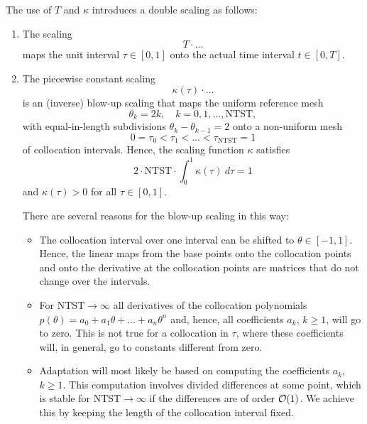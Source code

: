 The use of $T$ and $\kappa$ introduces a double scaling as follows:
\begin{enumerate}
\item The scaling $$T\cdot \dots$$ maps the unit interval $\tau\in[0,1]$ onto the actual time interval $t\in[0,T]$.
\item The piecewise constant scaling $$\kappa(\tau)\cdot\dots$$ is an (inverse) blow-up scaling that maps the uniform reference mesh $$ \theta_k = 2k, \quad k=0,1,\dots,\mathrm{NTST}, $$ with equal-in-length subdivisions $\theta_k - \theta_{k-1} = 2$ onto a non-uniform mesh $$0 = \tau_0 < \tau_1 < \dots < \tau_{\mathrm{NTST}} = 1$$ of collocation intervals. Hence, the scaling function $\kappa$ satisfies $$ 2\cdot \mathrm{NTST}\cdot \int_0^1\kappa(\tau)\:d\tau = 1$$ and $\kappa(\tau)>0$ for all $\tau\in[0,1]$.

There are several reasons for the blow-up scaling in this way:
\begin{itemize}
\item The collocation interval over one interval can be shifted to $\theta\in[-1,1]$. Hence, the linear maps from the base points onto the collocation points and onto the derivative at the collocation points are matrices that do not change over the intervals.
\item For $\mathrm{NTST}\to\infty$ all derivatives of the collocation polynomials $p(\theta)=a_0+a_1 \theta + \dots + a_n\theta^n$ and, hence, all coefficients $a_k$, $k\geq 1$, will go to zero. This is not true for a collocation in $\tau$, where these coefficients will, in general, go to constants different from zero.
\item Adaptation will most likely be based on computing the coefficients $a_k$, $k\geq 1$. This computation involves divided differences at some point, which is stable for $\mathrm{NTST}\to\infty$ if the differences are of order ${\cal{O}}(1)$. We achieve this by keeping the length of the collocation interval fixed.
\end{itemize}
\end{enumerate}

